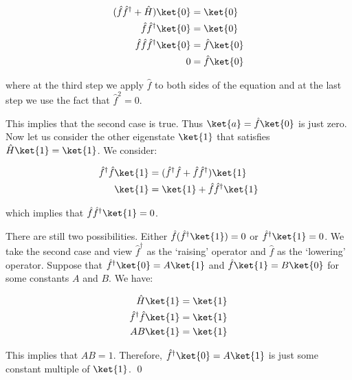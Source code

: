 \documentclass[12pt]{article}
\begin{document}
\begin{equation}
\begin{split}
    (\hat{f} \hat{f}^{\dagger} + \hat{H}) \ket{0} &= \ket{0} \\
    \hat{f} \hat{f}^{\dagger} \ket{0} &= \ket{0} \\
    \hat{f} \hat{f} \hat{f}^{\dagger} \ket{0} &= \hat{f} \ket{0} \\
    0 &= \hat{f} \ket{0}
\end{split}
\end{equation}

where at the third step we apply $\hat{f}$ to both sides of the equation and at the last step we use the fact that $\hat{f}^{2} = 0$.

This implies that the second case is true. Thus $\ket{a} = \hat{f} \ket{0}$ is just zero. Now let us consider the other eigenstate $\ket{1}$ that satisfies $\hat{H} \ket{1} = \ket{1}$. We consider:

\begin{equation}
\begin{split}
    \hat{f}^{\dagger} \hat{f} \ket{1} &= (\hat{f}^{\dagger} \hat{f} + \hat{f} \hat{f}^{\dagger}) \ket{1} \\
    \ket{1} &= \ket{1} + \hat{f} \hat{f}^{\dagger} \ket{1} \\
\end{split}
\end{equation}

which implies that $\hat{f} \hat{f}^{\dagger} \ket{1} = 0$.

There are still two possibilities. Either $\hat{f} (\hat{f}^{\dagger} \ket{1}) = 0$ or $\hat{f}^{\dagger} \ket{1} = 0$. We take the second case and view $\hat{f}^{\dagger}$ as the `raising' operator and $\hat{f}$ as the `lowering' operator. Suppose that $\hat{f}^{\dagger} \ket{0} = A \ket{1}$ and $\hat{f} \ket{1} = B \ket{0}$ for some constants $A$ and $B$. We have:

\begin{equation}
\begin{split}
    \hat{H} \ket{1} &= \ket{1} \\
    \hat{f}^{\dagger} \hat{f} \ket{1} &= \ket{1} \\
    AB \ket{1} &= \ket{1}
\end{split}
\end{equation}

This implies that $AB = 1$. Therefore, $\hat{f}^{\dagger} \ket{0} = A \ket{1}$ is just some constant multiple of $\ket{1}$.
\qed
\end{document}
